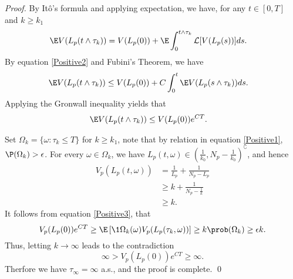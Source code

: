 \begin{proof}
		By It\^{o}'s formula and applying expectation, we have, for any 
	$t \in [0,T]$ and $k\geq k_1$
	\begin{align*}
		\E V(L_p(t\wedge\tau_k)) &= 
			V(L_p(0)) + 
			\E 
				\int_{0}^{t\wedge\tau_k} \mathcal{L}[V(L_p(s))]
			ds.
	\end{align*}
	By equation \eqref{Positive2} and Fubini's Theorem, we have
	\begin{align*}
		\E V(L_p(t\wedge\tau_k)) 
			&\leq 
				V(L_p(0)) + 
				C
				\int_{0}^{t}
					\E V(L_p(s\wedge\tau_k))
				ds.
	\end{align*}
	Applying the Gronwall inequality yields that	
	\begin{align}\label{Positive3}
		\E V(L_p(t\wedge\tau_k))&\leq V(L_p(0))e^{CT}.
	\end{align}

		Set 
	$
		\Omega_k = \{\omega : \tau_k\leq T\}
	$ for $k\geq k_1$, note that by relation in equation 
	\eqref{Positive1}, 
	$
		\P(\Omega_k) >  \epsilon
	$. For every 
	$
		\omega \in \Omega_k
	$, we have 
	$
		L_p(t,\omega) \in 
		\left(
			\frac{1}{k_0}, N_p - 
			\frac{1}{k_0}
		\right) ^ {\complement}
	$, and hence
	\begin{align*}
		V_p(L_p(t,\omega))
			&=
				\frac{1}{L_p} + 
				\frac{1}{N_p-L_p}
			\\
			&\geq 
				k + 
				\frac{1}{N_p - 
				\frac{1}{k}}
			\\
			&\geq k.
	\end{align*}
%	
	It follows from equation \eqref{Positive3}, that
	\begin{equation*}
		V_p(L_p(0)) e^{CT}
			\geq 
			\E 
			\left[
				\1{\Omega_k} (\omega)
				V_p(L_p(\tau_k,\omega))
			\right]
			\geq k
			\prob (\Omega_k)\geq \epsilon k.
	\end{equation*}
%
	Thus, letting $k\rightarrow \infty$ leads to the contradiction
	\begin{equation*}
		\infty>V_p(L_p(0))e^{CT}\geq \infty.	
	\end{equation*}
%
	Therfore we  have $\tau_\infty=\infty$ a.s., and the proof is 
	complete.
	\qed
\end{proof}
